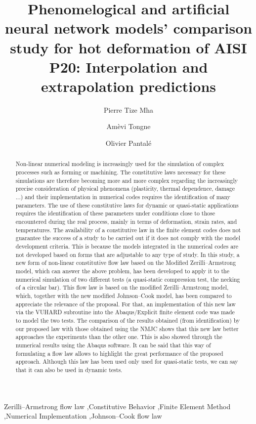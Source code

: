 \documentclass[twoside,english,1p,final,sort&compress]{elsarticle}
\theoremstyle{plain}
\begin{document}
\begin{frontmatter}

\title{Phenomelogical and artificial neural network models' comparison study for hot deformation of AISI P20: Interpolation and extrapolation predictions}

\author[LGP]{Pierre Tize Mha}
\author[LGP]{Amèvi Tongne}
\author[LGP]{Olivier Pantalé }


\address[LGP]{Laboratoire Génie de Production, INP/ENIT, Université de Toulouse, 47 Av d'Azereix, Tarbes, France 65016}

\begin{abstract}
Non-linear numerical modeling is increasingly used for the simulation of complex processes such as forming or machining. The constitutive laws necessary for these simulations are therefore becoming more and more complex regarding the increasingly precise consideration of physical phenomena (plasticity, thermal dependence, damage ...) and their implementation in numerical codes requires the identification of many parameters. The use of these constitutive laws for dynamic or quasi-static applications requires the identification of these parameters under conditions close to those encountered during the real process, mainly in terms of deformation, strain rates, and temperatures. The availability of a constitutive law in the finite element codes does not guarantee the success of a study to be carried out if it does not comply with the model development criteria. This is because the models integrated in the numerical codes are not developed based on forms that are adjustable to any type of study. In this study, a new form of non-linear constitutive flow law based on the Modified Zerilli--Armstrong model, which can answer the above problem, has been developed to apply it to the numerical simulation of two different tests (a quasi-static compression test, the necking of a circular bar). This flow law is based on the modified Zerilli--Armstrong model, which, together with the new modified Johnson--Cook model, has been compared to appreciate the relevance of the proposal. For that, an implementation of this new law via the VUHARD subroutine into the Abaqus/Explicit finite element code was made to model the two tests. The comparison of the results obtained (from identification) by our proposed law with those obtained using the NMJC shows that this new law better approaches the experiments than the other one. This is also showed through the numerical results using the Abaqus software. It can be said that this way of formulating a flow law allows to highlight the great performance of the proposed approach. Although this law has been used only used for quasi-static tests, we can say that it can also be used in dynamic tests.
\end{abstract}

\begin{keyword}
Zerilli--Armstrong flow law \sep Constitutive Behavior \sep Finite Element Method \sep Numerical Implementation \sep Johnson--Cook flow law
\end{keyword}

\end{frontmatter}
\end{document}
